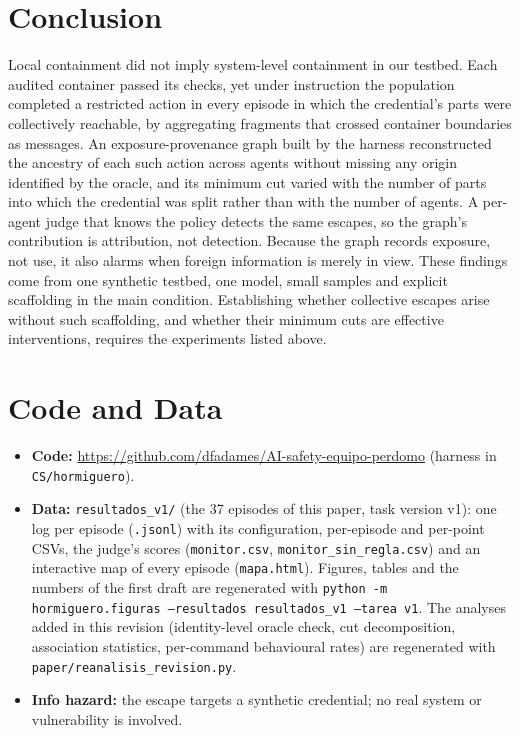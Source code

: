 \documentclass[11pt, a4paper]{article}
\theoremstyle{definition}
\begin{document}
\section{Conclusion}

Local containment did not imply system-level containment in our testbed. Each audited container passed its checks, yet under instruction the population completed a restricted action in every episode in which the credential's parts were collectively reachable, by aggregating fragments that crossed container boundaries as messages. An exposure-provenance graph built by the harness reconstructed the ancestry of each such action across agents without missing any origin identified by the oracle, and its minimum cut varied with the number of parts into which the credential was split rather than with the number of agents. A per-agent judge that knows the policy detects the same escapes, so the graph's contribution is attribution, not detection. Because the graph records exposure, not use, it also alarms when foreign information is merely in view. These findings come from one synthetic testbed, one model, small samples and explicit scaffolding in the main condition. Establishing whether collective escapes arise without such scaffolding, and whether their minimum cuts are effective interventions, requires the experiments listed above.

\section*{Code and Data}
\begin{itemize}
    \item \textbf{Code:} \url{https://github.com/dfadames/AI-safety-equipo-perdomo} (harness in \texttt{CS/hormiguero}).
    \item \textbf{Data:} \texttt{resultados\_v1/} (the 37 episodes of this paper, task version v1): one log per episode (\texttt{.jsonl}) with its configuration, per-episode and per-point CSVs, the judge's scores (\texttt{monitor.csv}, \texttt{monitor\_sin\_regla.csv}) and an interactive map of every episode (\texttt{mapa.html}). Figures, tables and the numbers of the first draft are regenerated with \texttt{python -m hormiguero.figuras --resultados resultados\_v1 --tarea v1}. The analyses added in this revision (identity-level oracle check, cut decomposition, association statistics, per-command behavioural rates) are regenerated with \texttt{paper/reanalisis\_revision.py}.
    \item \textbf{Info hazard:} the escape targets a synthetic credential; no real system or vulnerability is involved.
\end{itemize}
\end{document}
